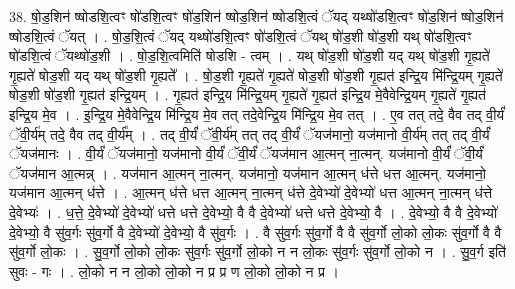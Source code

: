 \documentclass[17pt]{extarticle}
\begin{document}
38. षो॒ड॒शिन॑ ष्षोडशि॒त्वꣳ षो॑डशि॒त्वꣳ षो॑ड॒शिन॑ ष्षोड॒शिन॑ ष्षोडशि॒त्वं ॅयद् यथ्षो॑डशि॒त्वꣳ षो॑ड॒शिन॑ ष्षोड॒शिन॑ ष्षोडशि॒त्वं ॅयत् । . षो॒ड॒शि॒त्वं ॅयद् यथ्षो॑डशि॒त्वꣳ षो॑डशि॒त्वं ॅयथ् षो॑ड॒शी षो॑ड॒शी यथ् षो॑डशि॒त्वꣳ षो॑डशि॒त्वं ॅयथ्षो॑ड॒शी । . षो॒ड॒शि॒त्वमिति॑ षोडशि - त्वम् । . यथ् षो॑ड॒शी षो॑ड॒शी यद् यथ् षो॑ड॒शी गृ॒ह्यते॑ गृ॒ह्यते॑ षोड॒शी यद् यथ् षो॑ड॒शी गृ॒ह्यते᳚ । . षो॒ड॒शी गृ॒ह्यते॑ गृ॒ह्यते॑ षोड॒शी षो॑ड॒शी गृ॒ह्यत॑ इन्द्रि॒य मि॑न्द्रि॒यम् गृ॒ह्यते॑ षोड॒शी षो॑ड॒शी गृ॒ह्यत॑ इन्द्रि॒यम् । . गृ॒ह्यत॑ इन्द्रि॒य मि॑न्द्रि॒यम् गृ॒ह्यते॑ गृ॒ह्यत॑ इन्द्रि॒य मे॒वैवेन्द्रि॒यम् गृ॒ह्यते॑ गृ॒ह्यत॑ इन्द्रि॒य मे॒व । . इ॒न्द्रि॒य मे॒वैवेन्द्रि॒य मि॑न्द्रि॒य मे॒व तत् तदे॒वेन्द्रि॒य मि॑न्द्रि॒य मे॒व तत् । . ए॒व तत् तदे॒ वैव तद् वी॒र्यं॑ ॅवी॒र्य॑म् तदे॒ वैव तद् वी॒र्य᳚म् । . तद् वी॒र्यं॑ ॅवी॒र्य॑म् तत् तद् वी॒र्यं॑ ॅयज॑मानो॒ यज॑मानो वी॒र्य॑म् तत् तद् वी॒र्यं॑ ॅयज॑मानः । . वी॒र्यं॑ ॅयज॑मानो॒ यज॑मानो वी॒र्यं॑ ॅवी॒र्यं॑ ॅयज॑मान आ॒त्मन् ना॒त्मन्. यज॑मानो वी॒र्यं॑ ॅवी॒र्यं॑ ॅयज॑मान आ॒त्मन्न् । . यज॑मान आ॒त्मन् ना॒त्मन्. यज॑मानो॒ यज॑मान आ॒त्मन् ध॑त्ते धत्त आ॒त्मन्. यज॑मानो॒ यज॑मान आ॒त्मन् ध॑त्ते । . आ॒त्मन् ध॑त्ते धत्त आ॒त्मन् ना॒त्मन् ध॑त्ते दे॒वेभ्यो॑ दे॒वेभ्यो॑ धत्त आ॒त्मन् ना॒त्मन् ध॑त्ते दे॒वेभ्यः॑ । . ध॒त्ते॒ दे॒वेभ्यो॑ दे॒वेभ्यो॑ धत्ते धत्ते दे॒वेभ्यो॒ वै वै दे॒वेभ्यो॑ धत्ते धत्ते दे॒वेभ्यो॒ वै । . दे॒वेभ्यो॒ वै वै दे॒वेभ्यो॑ दे॒वेभ्यो॒ वै सु॑व॒र्गः सु॑व॒र्गो वै दे॒वेभ्यो॑ दे॒वेभ्यो॒ वै सु॑व॒र्गः । . वै सु॑व॒र्गः सु॑व॒र्गो वै वै सु॑व॒र्गो लो॒को लो॒कः सु॑व॒र्गो वै वै सु॑व॒र्गो लो॒कः । . सु॒व॒र्गो लो॒को लो॒कः सु॑व॒र्गः सु॑व॒र्गो लो॒को न न लो॒कः सु॑व॒र्गः सु॑व॒र्गो लो॒को न । . सु॒व॒र्ग इति॑ सुवः - गः । . लो॒को न न लो॒को लो॒को न प्र प्र ण लो॒को लो॒को न प्र । \newline
\pagebreak
{}
\end{document}
